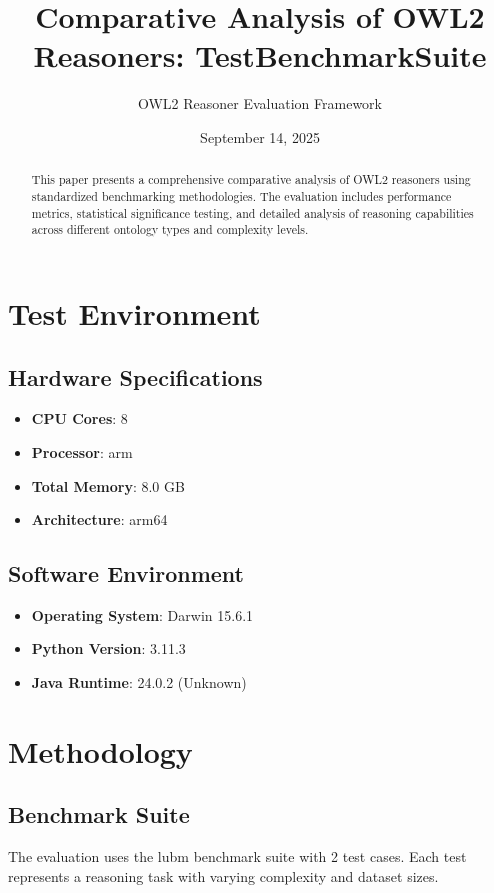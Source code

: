 \documentclass[11pt,a4paper]{{article}}
\title{{Comparative Analysis of OWL2 Reasoners: TestBenchmarkSuite}}
\author{{OWL2 Reasoner Evaluation Framework}}
\date{{September 14, 2025}}
\begin{document}
\maketitle

\begin{abstract}
This paper presents a comprehensive comparative analysis of OWL2 reasoners using standardized benchmarking methodologies. The evaluation includes performance metrics, statistical significance testing, and detailed analysis of reasoning capabilities across different ontology types and complexity levels.
\end{abstract}

\tableofcontents

\newpage

\section{Test Environment}

\subsection{Hardware Specifications}
\begin{itemize}
    \item \textbf{CPU Cores}: 8
    \item \textbf{Processor}: arm
    \item \textbf{Total Memory}: 8.0 GB
    \item \textbf{Architecture}: arm64
\end{itemize}

\subsection{Software Environment}
\begin{itemize}
    \item \textbf{Operating System}: Darwin 15.6.1
    \item \textbf{Python Version}: 3.11.3
    \item \textbf{Java Runtime}: 24.0.2 (Unknown)
\end{itemize}


\section{Methodology}

\subsection{Benchmark Suite}
The evaluation uses the lubm benchmark suite with 2 test cases. Each test represents a reasoning task with varying complexity and dataset sizes.
\end{document}
